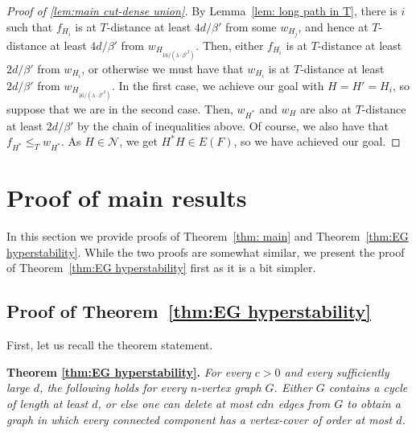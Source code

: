 \documentclass[10pt]{article}
\theoremstyle{definition}
\let\leq\leqslant
\begin{document}
\begin{proof}[Proof of \cref{lem:main cut-dense union}]
    By Lemma~\ref{lem: long path in T}, there is $i$ such that $f_{H_i}$ is at $T$-distance at least $4d/\beta' $ from some $w_{H_j}$, and hence at $T$-distance at least $4d/\beta'$ from $w_{H_{16/(\lambda \cdot \beta'^2 )}}$. Then, either $f_{H_i}$ is at $T$-distance at least $2d/\beta' $ from $w_{H_i}$, or otherwise we must have that $w_{H_i}$ is at $T$-distance at least $2d/\beta' $ from $w_{H_{16/(\lambda \cdot \beta'^2 )}}$. In the first case, we achieve our goal with $H=H'=H_i$, so suppose that we are in the second case. Then, $w_{H^*}$ and $w_H$ are also at $T$-distance at least $2d/\beta' $ by the chain of inequalities above. Of course, we also have that $f_{H^*}\leq_T w_{H^*}$. As $H\in\mathcal N$, we get $H^*H\in E(F)$, so we have achieved our goal.
\end{proof}



\section{Proof of main results}\label{sec:final}
In this section we provide proofs of Theorem~\ref{thm: main} and Theorem~\ref{thm:EG hyperstability}. While the two proofs are somewhat similar, we present the proof of Theorem~\ref{thm:EG hyperstability} first as it is a bit simpler.

\subsection{Proof of Theorem~\ref{thm:EG hyperstability}}
First, let us recall the theorem statement.
\vspace{2mm}


\noindent \textbf{Theorem \ref{thm:EG hyperstability}. }\textit{For every $c>0$ and every sufficiently large $d$, the following holds for every $n$-vertex graph $G$. Either $G$ contains a cycle of length at least $d$, or else one can delete at most $c dn$ edges from $G$ to obtain a graph in which every connected component has a vertex-cover of order at most $d$.}
\vspace{2mm}
\end{document}
